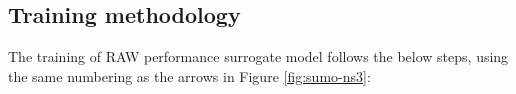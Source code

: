 \subsection{Training methodology \label{subs:raw_training}}


The training of RAW performance surrogate model follows the below steps, using the same numbering as the arrows in Figure \ref{fig:sumo-ns3}:

